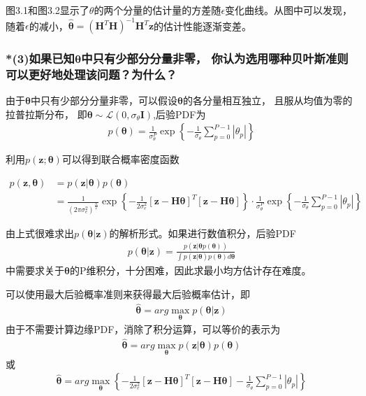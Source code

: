 \documentclass[fontset=windows]{article}
\numberwithin{figure}{section}
\begin{document}
图3.1和图3.2显示了\(\theta\)的两个分量的估计量的方差随\(\epsilon\)变化曲线。从图中可以发现，随着\(\epsilon\)的减小，\(\hat{\boldsymbol{\theta}}=(\mathbf{H}^T \mathbf{H})^{-1}\mathbf{H}^T\mathbf{z}\)的估计性能逐渐变差。

\subsubsection*{*(3)如果已知\(\boldsymbol{\theta}\)中只有少部分分量非零，
	你认为选用哪种贝叶斯准则可以更好地处理该问题？为什么？}

由于\(\boldsymbol{\theta}\)中只有少部分分量非零，可以假设\(\boldsymbol{\theta}\)的各分量相互独立，
且服从均值为零的拉普拉斯分布，
即\(\boldsymbol{\theta} \sim \mathcal{L}(0,\sigma_{\theta}\mathbf{I})\),后验PDF为
\begin{align*}
	p(\boldsymbol{\theta})=\frac{1}{\sigma_{\theta}^P}
	\exp\left\{-\frac{1}{\sigma_{\theta}}\sum_{p=0}^{P-1}|\theta_p| \right\}
\end{align*}

利用\(p(\mathbf{z};\boldsymbol{\theta})\)可以得到联合概率密度函数

\begin{align*}
	p(\mathbf{z},\boldsymbol{\theta})
	 & =p(\mathbf{z}|\boldsymbol{\theta})p(\boldsymbol{\theta}) \\
	 & =\frac{1}{(2\pi \sigma_e^2)^{\frac{N}{2}}}
	\exp\left\{-\frac{1}{2\sigma_e^2} \left[\mathbf{z-H}\boldsymbol{\theta}\right]^T
	\left[\mathbf{z-H}\boldsymbol{\theta}\right]\right\}\cdot \frac{1}{\sigma_{\theta}^P}
	\exp\left\{-\frac{1}{\sigma_{\theta}}\sum_{p=0}^{P-1}|\theta_p| \right\}
\end{align*}

由上式很难求出\(p(\boldsymbol{\theta}|\mathbf{z})\)的解析形式。如果进行数值积分，后验PDF
\begin{align*}
	p(\boldsymbol{\theta}|\mathbf{z})=\frac{p(\mathbf{z}|\boldsymbol{\theta}p(\boldsymbol{\theta}))}
	{\int p(\mathbf{z|\boldsymbol{\theta}})p(\boldsymbol{\theta})d\boldsymbol{\theta}}
\end{align*}
中需要求关于\(\boldsymbol{\theta}\)的P维积分，十分困难，因此求最小均方估计存在难度。

可以使用最大后验概率准则来获得最大后验概率估计，即
\begin{align*}
	\hat{\boldsymbol{\theta}}=arg \underset{\boldsymbol{\theta}}{\max}
	p(\boldsymbol{\theta |\mathbf{z}})
\end{align*}
由于不需要计算边缘PDF，消除了积分运算，可以等价的表示为
\begin{align*}
	\hat{\boldsymbol{\theta}}=arg \underset{\boldsymbol{\theta}}{\max}p(\mathbf{z}|\boldsymbol{\theta })
	p(\boldsymbol{\theta})
\end{align*}
或
\begin{align*}
	\hat{\boldsymbol{\theta}}=arg \underset{\boldsymbol{\theta}}{\max}
	\left\{-\frac{1}{2\sigma_e^2} \left[\mathbf{z-H}\boldsymbol{\theta}\right]^T
	\left[\mathbf{z-H}\boldsymbol{\theta}\right]
	-\frac{1}{\sigma_{\theta}}\sum_{p=0}^{P-1}|\theta_p|\right\}
\end{align*}
\end{document}
